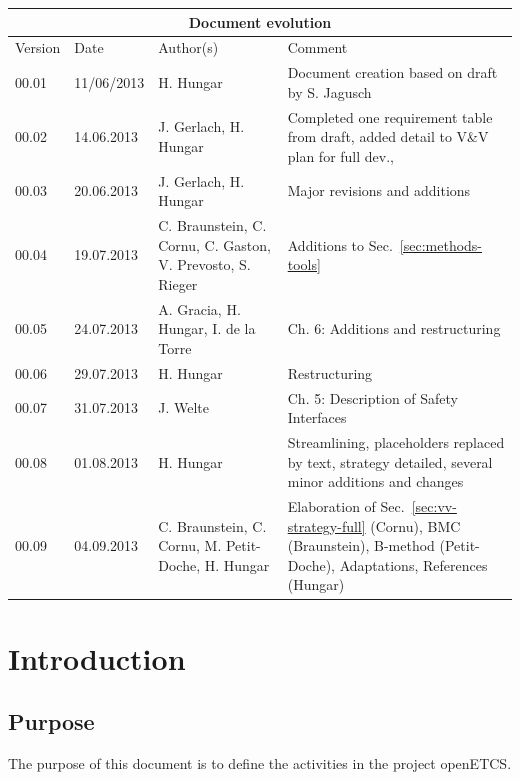 \documentclass{template/openetcs_report}
\begin{document}
\begin{tabular}{|p{1.5cm}|p{2cm}|p{3.5cm}|p{6cm}|}
\hline
\multicolumn{4}{|c|}{Document evolution} \\
\hline
Version &  Date & Author(s) & Comment  \\
\hline  
00.01 & 11/06/2013 & H. Hungar &  Document creation based on draft by
S. Jagusch\\
\hline
00.02 & 14.06.2013 & J. Gerlach, H. Hungar &  Completed one
requirement table from draft, added detail to V\&V plan for full dev., \\
\hline  
00.03 & 20.06.2013 & J. Gerlach, H. Hungar & Major revisions and
additions
\\\hline
00.04 & 19.07.2013 & C. Braunstein, C. Cornu, C. Gaston, V. Prevosto,
S. Rieger & Additions to Sec.~\ref{sec:methods-tools}
\\\hline
00.05 & 24.07.2013 & A. Gracia, H. Hungar, I. de la Torre & Ch. 6: Additions and
restructuring 
\\\hline
00.06 & 29.07.2013 & H. Hungar & Restructuring
\\\hline
00.07 & 31.07.2013 & J. Welte & Ch. 5: Description of Safety Interfaces
\\\hline
00.08 & 01.08.2013 & H. Hungar & Streamlining, placeholders replaced
by text, strategy detailed, several minor additions and changes
\\\hline
00.09 & 04.09.2013 & C. Braunstein, C. Cornu, M. Petit-Doche, H. Hungar & Elaboration of
Sec.~\ref{sec:vv-strategy-full} (Cornu), BMC (Braunstein), B-method
(Petit-Doche), Adaptations, References (Hungar)
\\
\hline
\end{tabular}




\mainmatter

\chapter{Introduction}

\section{Purpose}
\label{sec:purpose}

The purpose of this document is to define the \vv activities in the
project openETCS.  
\end{document}
